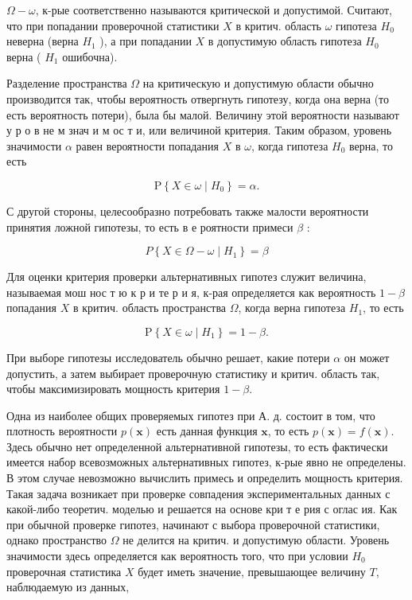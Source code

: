 \documentclass[10pt]{article}
\begin{document}
$\Omega-\omega$, к-рые соответственно называются критической и допустимой. Считают, что при попадании проверочной статистики $X$ в критич. область $\omega$ гипотеза $H_{0}$ неверна (верна $H_{1}$ ), а при попадании $X$ в допустимую область гипотеза $H_{0}$ верна ( $H_{1}$ ошибочна).



Разделение пространства $\Omega$ на критическую и допустимую области обычно производится так, чтобы вероятность отвергнуть гипотезу, когда она верна (то есть вероятность потери), была бы малой. Величину этой вероятности называют у р о в не м знач и м ос т и, или величиной критерия. Таким образом, уровень значимости $\alpha$ равен вероятности попадания $X$ в $\omega$, когда гипотеза $H_{0}$ верна, то есть



\[

\mathrm{P}\left\{X \in \omega \mid H_{0}\right\}=\alpha .

\]



С другой стороны, целесообразно потребовать также малости вероятности принятия ложной гипотезы, то есть в е роятности примеси $\beta$ :



\[

P\left\{X \in \Omega-\omega \mid H_{1}\right\}=\beta

\]



Для оценки критерия проверки альтернативных гипотез служит величина, называемая мош нос т ю к р и те р и я, к-рая определяется как вероятность $1-\beta$ попадания $X$ в критич. область пространства $\Omega$, когда верна гипотеза $H_{1}$, то есть



\[

\mathrm{P}\left\{X \in \omega \mid H_{1}\right\}=1-\beta .

\]



При выборе гипотезы исследователь обычно решает, какие потери $\alpha$ он может допустить, а затем выбирает проверочную статистику и критич. область так, чтобы максимизировать мощность критерия $1-\beta$.



Одна из наиболее общих проверяемых гипотез при А. д. состоит в том, что плотность вероятности $p(\boldsymbol{x})$ есть данная функция $\boldsymbol{x}$, то есть $p(\boldsymbol{x})=f(\boldsymbol{x})$. Здесь обычно нет определенной альтернативной гипотезы, то есть фактически имеется набор всевозможных альтернативных гипотез, к-рые явно не определены. В этом случае невозможно вычислить примесь и определить мощность критерия. Такая задача возникает при проверке совпадения экспериментальных данных с какой-либо теоретич. моделью и решается на основе кри т е рия с оглас ия. Как при обычной проверке гипотез, начинают с выбора проверочной статистики, однако пространство $\Omega$ не делится на критич. и допустимую области. Уровень значимости здесь определяется как вероятность того, что при условии $H_{0}$ проверочная статистика $X$ будет иметь значение, превышающее величину $T$, наблюдаемую из данных,
\end{document}
